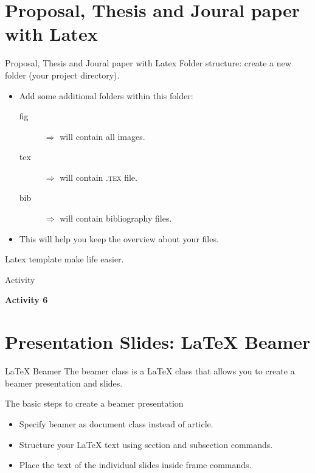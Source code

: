 \documentclass{bredelebeamer}
\begin{document}
\section{Proposal, Thesis and Joural paper with Latex}
\begin{frame}{Proposal, Thesis and Joural paper with Latex}
\alert{Folder structure}: create a new folder (your project directory). 
\begin{itemize}
	\item  Add some additional folders within this folder:
	\begin{description}
		\item [fig] $\Rightarrow$ will contain all images.
		\item [tex] $\Rightarrow$ will contain \textsc{.tex} file.
		\item [bib] $\Rightarrow$ will contain bibliography files.
	\end{description}
	\item This will help you keep the overview about your files.
\end{itemize}
Latex template make life easier.
\end{frame}

\begin{frame}[fragile]{Activity}
\begin{center}
	{\Large \textbf{Activity 6}}
\end{center}

\end{frame}

\section{Presentation Slides: LaTeX Beamer}

\begin{frame}[fragile]{LaTeX Beamer}
The beamer class is a LaTeX class that allows you to create a
beamer presentation and slides.
\begin{block}{The basic steps to create a beamer presentation }
	\begin{itemize}
		\item Specify beamer as document class instead of article.
		\item Structure your LaTeX text using section and subsection
		commands.
		\item Place the text of the individual slides inside frame commands.
	\end{itemize}
\end{block}

\end{frame}
\end{document}
